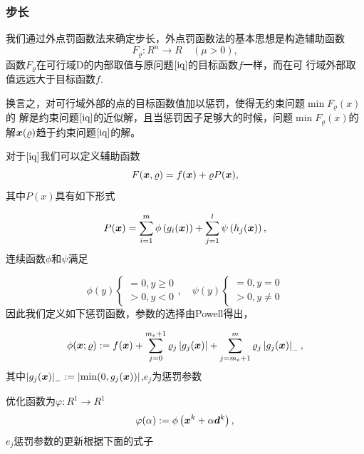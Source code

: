 \documentclass[12pt,oneside,a4paper]{article}
\begin{document}
\subsubsection{步长}
我们通过外点罚函数法来确定步长，外点罚函数法的基本思想是构造辅助函数
\begin{equation*}
F_{\varrho}: R^{n} \rightarrow R \quad(\mu>0),
\end{equation*}
函数$F_{\varrho}$在可行域D的内部取值与原问题$\ref{iq}$的目标函数$f$一样，而在可
行域外部取值远远大于目标函数$f$.

换言之，对可行域外部的点的目标函数值加以惩罚，使得无约束问题$\min F_{\varrho}(x)$的
解是约束问题$\ref{iq}$的近似解，且当惩罚因子足够大的时候，问题$\min F_{\varrho}(x)$的
解${\boldsymbol x}(\varrho)$趋于约束问题$\ref{iq}$的解。

对于$\ref{iq}$我们可以定义辅助函数
\begin{equation*}
F({\boldsymbol x}, \varrho)=f({\boldsymbol x})+\varrho P({\boldsymbol x}),
\end{equation*}
其中$P(x)$具有如下形式

\begin{equation*}
P({\boldsymbol x})=\sum_{i=1}^{m} \phi\left(g_{i}({\boldsymbol x})\right)+\sum_{j=1}^{l} \psi\left(h_{j}({\boldsymbol x})\right),
\end{equation*}
连续函数$\phi$和$\psi$满足

\begin{equation*}
\phi(y)\left\{\begin{array}{l}
=0, y \geq 0 \\
>0, y<0
\end{array}, \quad \psi(y)\left\{\begin{array}{l}
=0, y=0 \\
>0, y \neq 0
\end{array}\right.\right.
\end{equation*}
因此我们定义如下惩罚函数，参数的选择由Powell\cite{powell}得出，

\begin{equation*}
\phi({\boldsymbol x} ; \varrho):=f({\boldsymbol x})+\sum_{j=0}^{m_{e}+1} \varrho_{j}\left|g_{j}({\boldsymbol x})\right|+
\sum_{j=m_{e}+1}^{m} \varrho_{j}\left|g_{j}({\boldsymbol x})\right|_{-},
\end{equation*}
其中$\left|g_{j}({\boldsymbol x})\right|_{-}:=\left|\min (0, g_{j}({\boldsymbol x})) \right|$,$e_j$为惩罚参数

优化函数为$\varphi : R^1 \rightarrow R^1$
\begin{equation*}
\varphi(\alpha):=\phi\left({\boldsymbol x}^{k}+\alpha {\boldsymbol d}^{k}\right),
\end{equation*}
$e_j$惩罚参数的更新根据下面的式子
\end{document}
